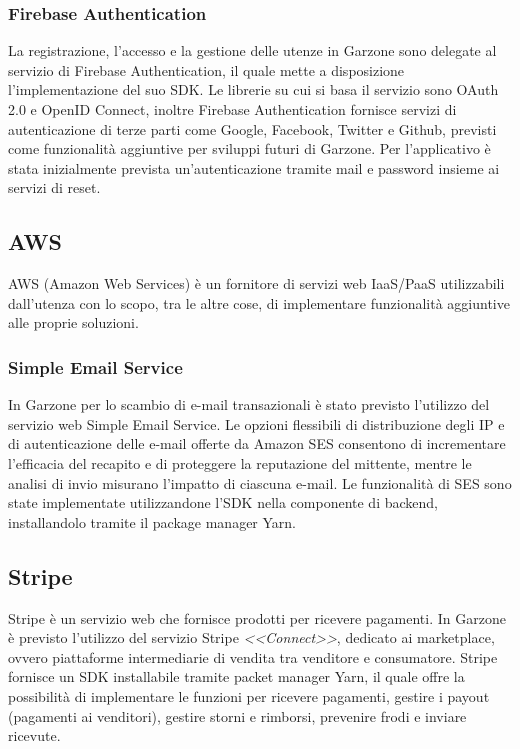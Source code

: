 \subsubsection{Firebase Authentication}
La registrazione, l'accesso e la gestione delle utenze in Garzone sono delegate al servizio di Firebase Authentication, il quale mette a disposizione l'implementazione del suo SDK. Le librerie su cui si basa il servizio sono OAuth 2.0 e OpenID Connect, inoltre Firebase Authentication fornisce servizi di autenticazione di terze parti come Google, Facebook, Twitter e Github, previsti come funzionalità aggiuntive per sviluppi futuri di Garzone. Per l'applicativo è stata inizialmente prevista un'autenticazione tramite mail e password insieme ai servizi di reset. 
\subsection{AWS}
AWS (Amazon Web Services) è un fornitore di servizi web IaaS/PaaS utilizzabili dall'utenza con lo scopo, tra le altre cose, di implementare funzionalità aggiuntive alle proprie soluzioni.
\subsubsection{Simple Email Service} 
In Garzone per lo scambio di e-mail transazionali è stato previsto l'utilizzo del servizio web Simple Email Service. Le opzioni flessibili di distribuzione degli IP e di autenticazione delle e-mail offerte da Amazon SES consentono di incrementare l'efficacia del recapito e di proteggere la reputazione del mittente, mentre le analisi di invio misurano l'impatto di ciascuna e-mail\cite{SES}. Le funzionalità di SES sono state implementate utilizzandone l'SDK nella componente di backend, installandolo tramite il package manager Yarn.
\subsection{Stripe}
Stripe è un servizio web che fornisce prodotti per ricevere pagamenti. In Garzone è previsto l'utilizzo del servizio Stripe \textit{<<Connect>>}, dedicato ai marketplace, ovvero piattaforme intermediarie di vendita tra venditore e consumatore. Stripe fornisce un SDK installabile tramite packet manager Yarn, il quale offre la possibilità di implementare le funzioni per ricevere pagamenti, gestire i payout (pagamenti ai venditori), gestire storni e rimborsi, prevenire frodi e inviare ricevute.
